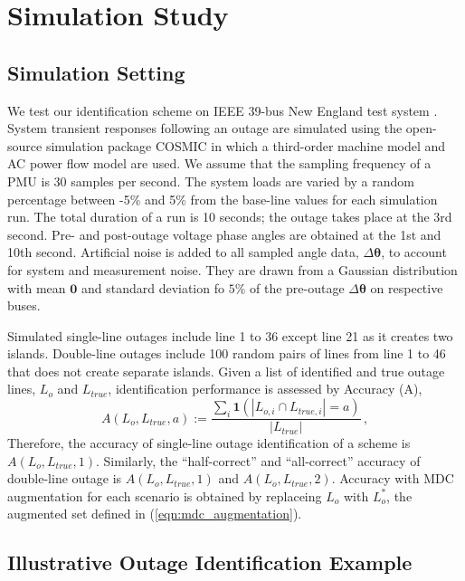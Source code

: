 \section{Simulation Study}
\label{sec:simulation}


\subsection{Simulation Setting}
We test our identification scheme on IEEE 39-bus New England test system \cite{athay1979practical}. System transient responses following an outage are simulated using the open-source simulation package COSMIC \cite{Song2016} in which a third-order machine model and AC power flow model are used. We assume that the sampling frequency of a PMU is 30 samples per second. The system loads are varied by a random percentage between -5\% and 5\% from the base-line values for each simulation run. The total duration of a run is 10 seconds; the outage takes place at the 3rd second. Pre- and post-outage voltage phase angles are obtained at the 1st and 10th second. Artificial noise is added to all sampled angle data, $\Delta \boldsymbol{\theta}$, to account for system and measurement noise. They are drawn from a Gaussian distribution with mean $\mathbf{0}$ and standard deviation fo $5\%$ of the pre-outage $\Delta\boldsymbol{\theta}$ on respective buses. 

Simulated single-line outages include line 1 to 36 except line 21 as it creates two islands. Double-line outages include 100 random pairs of lines from line 1 to 46 that does not create separate islands. Given a list of identified and true outage lines, $L_o$ and $L_{true}$, identification performance is assessed by Accuracy (A), 
\begin{equation}
\label{eqn:accuracy}
A(L_o, L_{true}, a):=\frac{\sum_i \mathbf{1}(\left| L_{o,i} \cap L_{true, i} \right| = a)}{\left| L_{true} \right|} \,,
\end{equation}
Therefore, the accuracy of single-line outage identification of a scheme is $A(L_o, L_{true}, 1)$. Similarly, the ``half-correct'' and ``all-correct'' accuracy of double-line outage is $A(L_o, L_{true}, 1)$ and $A(L_o, L_{true}, 2)$. Accuracy with MDC augmentation for each scenario is obtained by replaceing $L_o$ with $L_o^*$, the augmented set defined in (\ref{eqn:mdc_augmentation}). 


\subsection{Illustrative Outage Identification Example}  

